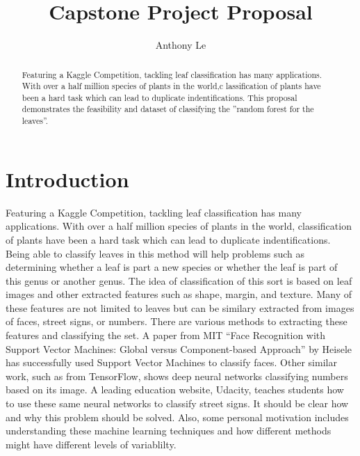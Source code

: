\documentclass{article}
\begin{document}
\title{Capstone Project Proposal}
\author{Anthony Le}

\maketitle

\begin{abstract}
Featuring a Kaggle Competition, tackling leaf classification has many applications. With over a half million species of plants in the world,c lassification of plants have been a hard task which can lead to duplicate indentifications. This proposal demonstrates the feasibility and dataset of classifying the ''random forest for the leaves''. 
\end{abstract}

\section{Introduction}
	Featuring a Kaggle Competition, tackling leaf classification has many applications. With over a half million species of plants in the world, classification of plants have been a hard task which can lead to duplicate indentifications. Being able to classify leaves in this method will help problems such as determining whether a leaf is part a new species or whether the leaf is part of this genus or another genus. The idea of classification of this sort is based on leaf images and other extracted features such as shape, margin, and texture. Many of these features are not limited to leaves but can be similary extracted from images of faces, street signs, or numbers. There are various methods to extracting these features and classifying the set. A paper from MIT ``Face Recognition with Support Vector Machines: Global versus Component-based Approach'' by Heisele has successfully used Support Vector Machines to classify faces. Other similar work, such as from TensorFlow, shows deep neural networks classifying numbers based on its image. A leading education website, Udacity, teaches students how to use these same neural networks to classify street signs.
\newline
\newline
	It should be clear how and why this problem should be solved. Also, some personal motivation includes understanding these machine learning techniques and how different methods might have different levels of variablilty. 
	
\end{document}
